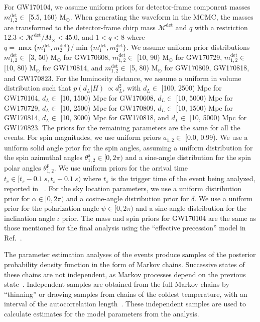 For GW170104, we assume uniform priors for detector-frame component masses $m_{1,2}^{\mathrm{det}} \in$ [5.5, 160) M$_\odot$. When generating the waveform in the MCMC, the masses are transformed to the detector-frame chirp mass $\mathcal{M}^\mathrm{det}$ and $q$ with a restriction $12.3 < \mathcal{M}^\mathrm{det}/M_\odot < 45.0$, and $1 < q < 8$ where $q = \max\{ m_1^{\mathrm{det}}, m_2^{\mathrm{det}} \} / \min\{ m_1^{\mathrm{det}}, m_2^{\mathrm{det}} \}$. We assume uniform prior distributions $m_{1,2}^{\mathrm{det}} \in$ [3, 50) M$_\odot$ for GW170608, $m_{1,2}^{\mathrm{det}} \in$ [10, 90) M$_\odot$ for GW170729, $m_{1,2}^{\mathrm{det}} \in$ [10, 80) M$_\odot$ for GW170814, and $m_{1,2}^{\mathrm{det}} \in$ [5, 80) M$_\odot$ for GW170809, GW170818, and GW170823. For the luminosity distance, we assume a uniform in volume distribution such that $p(d_L | H)~\propto d_L^2$, with $d_L \in$ [100, 2500) Mpc for GW170104, $d_L \in$ [10, 1500) Mpc for GW170608, $d_L \in$ [10, 5000) Mpc for GW170729, $d_L \in$ [10, 2500) Mpc for GW170809, $d_L \in$ [10, 1500) Mpc for GW170814, $d_L \in$ [10, 3000) Mpc for GW170818, and $d_L \in$ [10, 5000) Mpc for GW170823. The priors for the remaining parameters are the same for all the events. For spin magnitudes, we use uniform priors $a_{1,2} \in$ [0.0, 0.99).
We use a uniform solid angle prior for the spin angles, assuming a uniform distribution for the spin azimuthal angles $\theta_{1,2}^\mathrm{a} \in [0, 2\pi)$ and a sine-angle distribution for the spin polar angles $\theta_{1,2}^\mathrm{p}$.
We use uniform priors for the arrival time $t_c \in [t_s - 0.1~s, t_s + 0.1~s)$ where $t_s$ is the trigger time of the event being analyzed, reported in ~\cite{Abbott:2017vtc,Abbott:2017gyy,Abbott:2017oio}.
For the sky location parameters, we use a uniform distribution prior for $\alpha \in [0, 2\pi)$ and a cosine-angle distribution prior for $\delta$. We use a uniform prior for the polarization angle $\psi \in [0, 2 \pi)$ and a sine-angle distribution for the inclination angle $\iota$ prior. The mass and spin priors for GW170104 are the same as those mentioned for the final analysis using the ``effective precession'' model in Ref.~\cite{Abbott:2017vtc}.

The parameter estimation analyses of the events produce samples of the posterior probability density function in the form of Markov chains. Successive states of these chains are not independent, as Markov processes depend on the previous state~\cite{Christensen:2004jm}. Independent samples are obtained from the full Markov chains by ``thinning'' or drawing samples from chains of the coldest temperature, with an interval of the autocorrelation length~\cite{Biwer:2018osg,Christensen:2004jm}. These independent samples are used to calculate estimates for the model parameters from the analysis.



